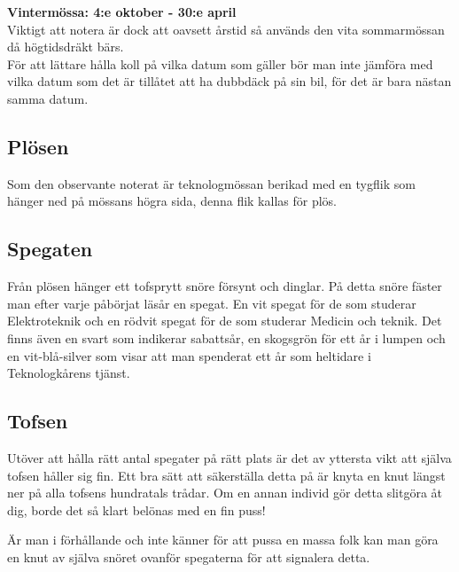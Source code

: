 \textbf{Vintermössa: 4:e oktober - 30:e april}
\\


Viktigt att notera är dock att oavsett årstid så används den vita sommarmössan då högtidsdräkt bärs.
\\


För att lättare hålla koll på vilka datum som gäller bör man inte jämföra med vilka datum som det är tillåtet att ha dubbdäck på sin bil, för det är bara nästan samma datum.


\newpage
\enlargethispage*{1cm}

\subsection*{Plösen}
Som den observante noterat är teknologmössan berikad med en tygflik som hänger ned på mössans högra sida, denna flik kallas för plös. 
\\

\subsection*{Spegaten}
Från plösen hänger ett tofsprytt snöre försynt och dinglar. På detta snöre fäster man efter varje påbörjat läsår en spegat. En vit spegat för de som studerar Elektroteknik och en rödvit spegat för de som studerar Medicin och teknik.
Det finns även en svart som indikerar sabattsår, en skogsgrön för ett år i lumpen och en vit-blå-silver som visar att man spenderat ett år som heltidare i Teknologkårens tjänst.
\\


\subsection*{Tofsen}
Utöver att hålla rätt antal spegater på rätt plats är det av yttersta vikt att själva tofsen håller sig fin. Ett bra sätt att säkerställa detta på är knyta en knut längst ner på alla tofsens hundratals trådar. Om en annan individ gör detta slitgöra åt dig, borde det så klart belönas med en fin puss!


Är man i förhållande och inte känner för att pussa en massa folk kan man göra en knut av själva snöret ovanför spegaterna för att signalera detta.
\\


\newpage

